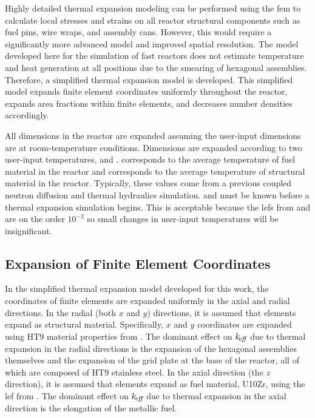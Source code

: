   Highly detailed thermal expansion modeling can be performed using the
  \gls{fem} to calculate local stresses and strains on all reactor
  structural components such as fuel pins, wire wraps, and assembly cans.
  However, this would require a significantly more advanced model and improved
  spatial resolution. The model developed here for the simulation of fast
  reactors does not estimate temperature and heat generation at all positions
  due to the smearing of hexagonal assemblies. Therefore, a simplified thermal
  expansion model is developed. This simplified model expands finite element
  coordinates uniformly throughout the reactor, expands area fractions within
  finite elements, and decreases number densities accordingly.

  All dimensions in the reactor are expanded assuming the user-input
  dimensions are at room-temperature conditions. Dimensions are expanded
  according to two user-input temperatures, \texpfuel and \texpstruct.
  \texpfuel corresponds to the average temperature of fuel material in the
  reactor and \texpstruct corresponds to the average temperature of structural
  material in the reactor. Typically, these values come from a previous
  coupled neutron diffusion and thermal hydraulics simulation. \texpfuel and
  \texpstruct must be known before a thermal expansion simulation begins. This
  is acceptable because the \glspl{lef} from  and
   are on the order $10^{-2}$ so small changes in
  user-input temperatures will be insignificant.

  \subsection{Expansion of Finite Element Coordinates}
    \label{sec:expansion_of_fe_coordinates}
    In the simplified thermal expansion model developed for this work, the
    coordinates of finite elements are expanded uniformly in the axial and
    radial directions. In the radial (both $x$ and $y$) directions,
    it is assumed that elements expand as structural material. Specifically,
    $x$ and $y$ coordinates are expanded using HT9 material properties from
    . The dominant effect on $k_{\!\mbox{\scriptsize \em eff}}$ due to thermal expansion
    in the radial directions is the expansion of the hexagonal assemblies
    themselves and the expansion of the grid plate at the base of the reactor,
    all of which are composed of HT9 stainless steel. In the axial direction
    (the $z$ direction), it is assumed that elements expand as fuel material,
    U10Zr, using the \gls{lef} from . The dominant effect on
    $k_{\!\mbox{\scriptsize \em eff}}$ due to thermal expansion in the axial direction is the elongation of
    the metallic fuel.

